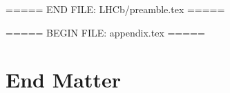 \usepackage[pdftex,
            pdfauthor={\paperauthors},
            pdftitle={\paperasciititle},
            pdfkeywords={\paperkeywords}]{hyperref}

\usepackage{hyperxmp}




\usepackage[colorinlistoftodos,textsize=scriptsize]{todonotes}


\usepackage[bottom,flushmargin,hang,multiple]{footmisc}

\usepackage[all]{hypcap}





\hypersetup{
  colorlinks   = true,
  urlcolor     = blue,
  linkcolor    = blue,
  citecolor    = red
}


\ifEnableSectionTOCLinks
    \usepackage[explicit]{titlesec}


    \let\oldcontentsline\contentsline
    \renewcommand\contentsline[4]{\hypertarget{toc#4}{}\oldcontentsline{#1}{#2}{#3}{#4}}






\fi


\usepackage{cite}
\usepackage{LHCb/mciteplus}
===== END FILE: LHCb/preamble.tex =====

===== BEGIN FILE: appendix.tex =====







\appendix
\section*{End Matter}


